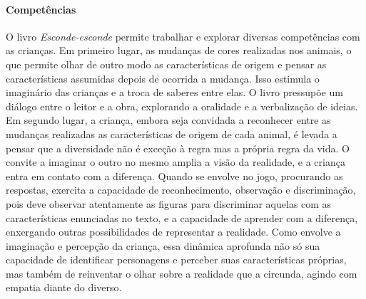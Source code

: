\documentclass[11pt]{extarticle}
\begin{document}
\paragraph{Competências}
O livro \textit{Esconde-esconde} permite trabalhar e explorar diversas competências com as crianças. Em primeiro lugar, as mudanças de cores realizadas nos animais, o que permite olhar de outro modo as características de origem e pensar as características assumidas depois de ocorrida a mudança. Isso estimula o imaginário das crianças e a troca de saberes entre elas. O livro pressupõe um diálogo entre o leitor e a obra, explorando a oralidade e a verbalização de ideias. Em segundo lugar, a criança, embora seja convidada a reconhecer entre as mudanças realizadas as características de origem de cada animal, é levada a pensar que a diversidade não é exceção à regra mas a própria regra da vida. O convite a imaginar o outro no mesmo amplia a visão da realidade, e a criança entra em contato com a diferença. Quando se envolve no jogo, procurando as respostas, exercita a capacidade de reconhecimento, observação e discriminação, pois deve observar atentamente as figuras para discriminar aquelas com as características enunciadas no texto, e a capacidade de aprender com a diferença, enxergando outras possibilidades de representar a realidade. Como envolve a imaginação e percepção da criança, essa dinâmica aprofunda não só sua capacidade de identificar personagens e perceber suas características próprias, mas também de reinventar o olhar sobre a realidade que a circunda, agindo com empatia diante do diverso.

\reversemarginpar
\marginparwidth=5cm
\end{document}
